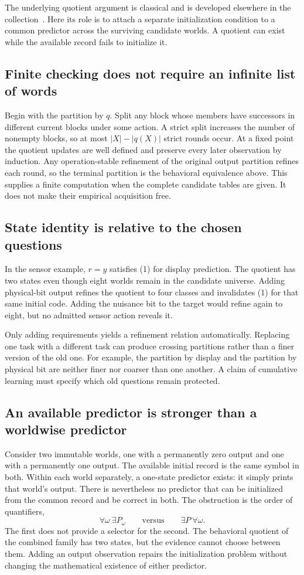 \documentclass[11pt,letterpaper]{article}
\theoremstyle{plain}
\theoremstyle{definition}
\begin{document}
The underlying quotient argument is classical and is developed elsewhere in the collection~\cite{understanding,resolution}. Here its role is to attach a separate initialization condition to a common predictor across the surviving candidate worlds. A quotient can exist while the available record fails to initialize it.

\subsection{Finite checking does not require an infinite list of words}
Begin with the partition by $q$. Split any block whose members have successors in different current blocks under some action. A strict split increases the number of nonempty blocks, so at most $|X|-|q(X)|$ strict rounds occur. At a fixed point the quotient updates are well defined and preserve every later observation by induction. Any operation-stable refinement of the original output partition refines each round, so the terminal partition is the behavioral equivalence above. This supplies a finite computation when the complete candidate tables are given. It does not make their empirical acquisition free.

\subsection{State identity is relative to the chosen questions}
In the sensor example, $r=y$ satisfies (1) for display prediction. The quotient has two states even though eight worlds remain in the candidate universe. Adding physical-bit output refines the quotient to four classes and invalidates (1) for that same initial code. Adding the nuisance bit to the target would refine again to eight, but no admitted sensor action reveals it.

Only adding requirements yields a refinement relation automatically. Replacing one task with a different task can produce crossing partitions rather than a finer version of the old one. For example, the partition by display and the partition by physical bit are neither finer nor coarser than one another. A claim of cumulative learning must specify which old questions remain protected.

\subsection{An available predictor is stronger than a worldwise predictor}
Consider two immutable worlds, one with a permanently zero output and one with a permanently one output. The available initial record is the same symbol in both. Within each world separately, a one-state predictor exists: it simply prints that world's output. There is nevertheless no predictor that can be initialized from the common record and be correct in both. The obstruction is the order of quantifiers,
\[
\forall\omega\ \exists P_\omega
\qquad\text{versus}\qquad
\exists P\ \forall\omega.
\]
The first does not provide a selector for the second. The behavioral quotient of the combined family has two states, but the evidence cannot choose between them. Adding an output observation repairs the initialization problem without changing the mathematical existence of either predictor.
\end{document}

